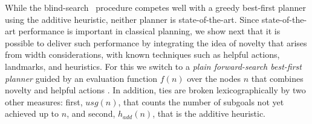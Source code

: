 

While the blind-search \SR\ procedure competes well with a greedy
best-first planner using the additive heuristic, neither planner is
state-of-the-art. Since state-of-the-art performance is important in
classical planning, we show next that it is possible to deliver such
performance by integrating the idea of novelty that arises from width
considerations, with known techniques such as helpful actions,
landmarks, and heuristics. For this we switch to a \emph{plain
  forward-search best-first planner} guided by an evaluation function
$f(n)$ over the nodes $n$ that combines novelty and
helpful actions \cite{nir:ecai12}.  In addition, ties are broken
lexicographically by two other measures: first, $usg(n)$, that counts
the number of subgoals not yet achieved up to $n$, and second,
$h_{add}(n)$, that is the additive heuristic.

